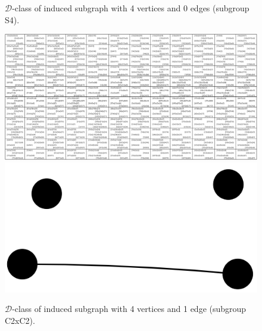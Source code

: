\begin{appendices}
\begin{figure}[H]
\caption{$\mathcal{D}$-class of induced subgraph with 4 vertices and 0 edges (subgroup S4).}
\end{figure}

\begin{figure}[H]
\includegraphics[width=\textwidth,keepaspectratio]{images/x9/x9_4v_1e.png}
\includegraphics[scale=0.1]{images/x9/x9_4v_1e_vis.png}
\caption{$\mathcal{D}$-class of induced subgraph with 4 vertices and 1 edge (subgroup C2xC2).}
\end{figure}


\end{appendices}
